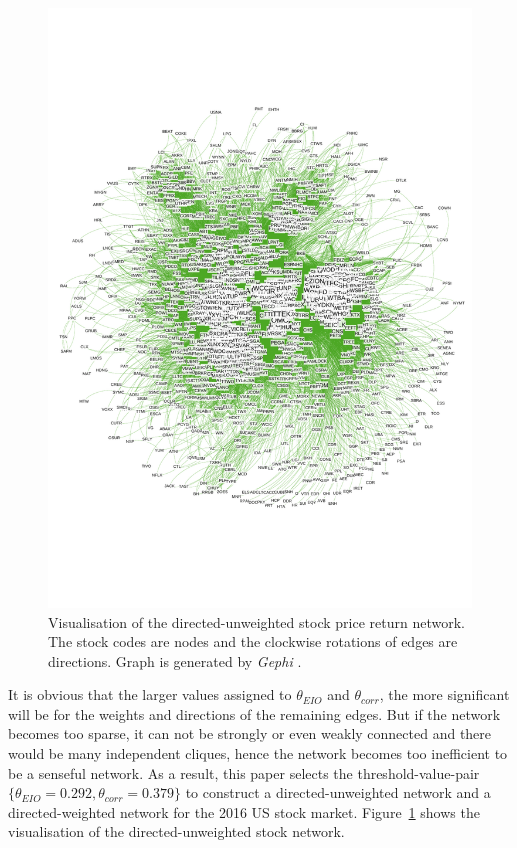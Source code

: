 \begin{figure}
	\begin{center}
		\includegraphics[width=14cm]{Graph_01}
	\end{center}
	\caption{Visualisation of the directed-unweighted stock price return network. The stock codes are nodes and the clockwise rotations of edges are directions. Graph is generated by \textit{Gephi} \cite{ICWSM09154}.}
	\label{fig:Graph_01}
\end{figure}

It is obvious that the larger values assigned to $\theta_{EIO}$ and $\theta_{corr}$, the more significant will be for the weights and directions of the remaining edges. But if the network becomes too sparse, it can not be strongly or even weakly connected and there would be many independent cliques, hence the network becomes too inefficient to be a senseful network. As a result, this paper selects the threshold-value-pair $\{\theta_{EIO}=0.292, \theta_{corr}=0.379\}$ to construct a directed-unweighted network and a directed-weighted network for the 2016 US stock market. Figure~\ref{fig:Graph_01} shows the visualisation of the directed-unweighted stock network.

